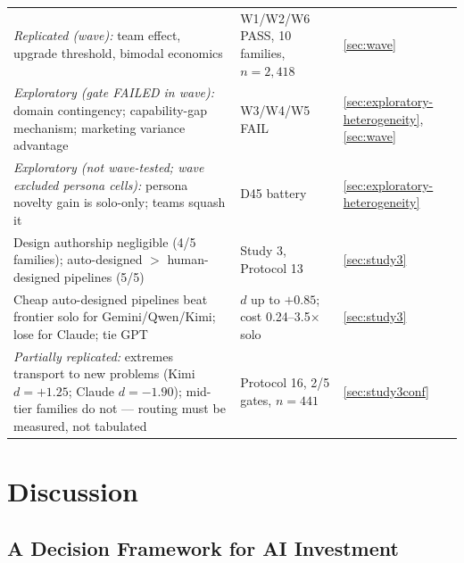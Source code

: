 \documentclass[12pt,a4paper]{article}
\begin{document}
\begin{table}[ht]
\begin{tabular}{@{}>{\raggedright\arraybackslash}p{7.6cm} >{\raggedright\arraybackslash}p{4.6cm} >{\raggedright\arraybackslash}p{2.2cm}@{}}
    \emph{Replicated (wave):} team effect, upgrade threshold, bimodal economics & W1/W2/W6 PASS, 10 families, $n = 2{,}418$ & \cref{sec:wave} \\
    \emph{Exploratory (gate FAILED in wave):} domain contingency; capability-gap mechanism; marketing variance advantage & W3/W4/W5 FAIL & \cref{sec:exploratory-heterogeneity}, \cref{sec:wave} \\
    \emph{Exploratory (not wave-tested; wave excluded persona cells):} persona novelty gain is solo-only; teams squash it & D45 battery & \cref{sec:exploratory-heterogeneity} \\
    Design authorship negligible (4/5 families); auto-designed $>$ human-designed pipelines (5/5) & Study 3, Protocol 13 & \cref{sec:study3} \\
    Cheap auto-designed pipelines beat frontier solo for Gemini/Qwen/Kimi; lose for Claude; tie GPT & $d$ up to $+0.85$; cost 0.24--3.5$\times$ solo & \cref{sec:study3} \\
    \emph{Partially replicated:} extremes transport to new problems (Kimi $d = +1.25$; Claude $d = -1.90$); mid-tier families do not --- routing must be measured, not tabulated & Protocol 16, 2/5 gates, $n = 441$ & \cref{sec:study3conf} \\
    \bottomrule
  \end{tabular}
\end{table}

\section{Discussion}\label{sec:discussion}

\subsection{A Decision Framework for AI Investment}\label{sec:decision-framework}
\end{document}
